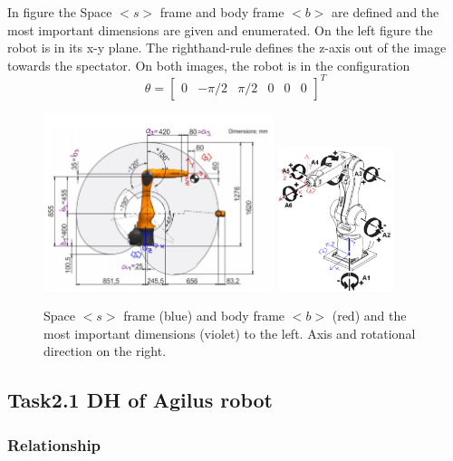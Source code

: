 In figure \label{fig:robot_frames} the Space $<s>$ frame and body frame $<b>$ are defined and the most important dimensions are given and enumerated. On the left figure the robot is in its x-y plane. The righthand-rule defines the z-axis out of the image towards the spectator. On both images, the robot is in the configuration 
\begin{equation}
    \theta =
    \begin{bmatrix}
    0 & −\pi/2 & \pi/2 & 0 & 0 & 0
    \end{bmatrix}
    ^{T}
\end{equation}
\begin{figure}[H]
    \centering
    \includegraphics[width=0.6\textwidth]{Images/Task2/robot_dimensions2.jpg}
    \includegraphics[width=0.3\textwidth]{Images/Task2/robot_axis2.jpg}
    \caption[Frames of the robot]{Space $<s>$ frame (blue) and body frame $<b>$ (red) and the most important dimensions (violet) to the left. Axis and rotational direction on the right.}
    \label{fig:robot_frames}
\end{figure}

\subsection{Task2.1 DH of Agilus robot}
\subsubsection{Relationship}

